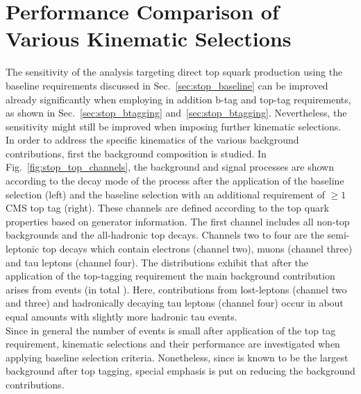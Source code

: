 \section{Performance Comparison of Various Kinematic Selections}
\label{sec:stop_cuts}
The sensitivity of the analysis targeting direct top squark production using the baseline requirements discussed in Sec.~\ref{sec:stop_baseline} can be improved already significantly when employing in addition b-tag and top-tag requirements, as shown in Sec.~\ref{sec:stop_btagging} and~\ref{sec:stop_btagging}. Nevertheless, the sensitivity might still be improved when imposing further kinematic selections. \\
In order to address the specific kinematics of the various background contributions, first the background composition is studied. In Fig.~\ref{fig:stop_top_channels}, the background and signal processes are shown according to the decay mode of the process after the application of the baseline selection (left) and the baseline selection with an additional requirement of $\ge 1$ CMS top tag (right). These channels are defined according to the top quark properties based on generator information. The first channel includes all non-top backgrounds and the all-hadronic top decays. Channels two to four are the semi-leptonic top decays which contain electrons (channel two), muons (channel three) and tau leptons (channel four). The distributions exhibit that after the application of the top-tagging requirement the main background contribution arises from \ttbar events (in total \todo{\%}). Here, contributions from lost-leptons (channel two and three) and hadronically decaying tau leptons (channel four) occur in about equal amounts with slightly more hadronic tau events. \\
Since in general the number of events is small after application of the top tag requirement, kinematic selections and their performance are investigated when applying baseline selection criteria. Nonetheless, since \ttbar is known to be the largest background after top tagging, special emphasis is put on reducing the \ttbar background contributions.
